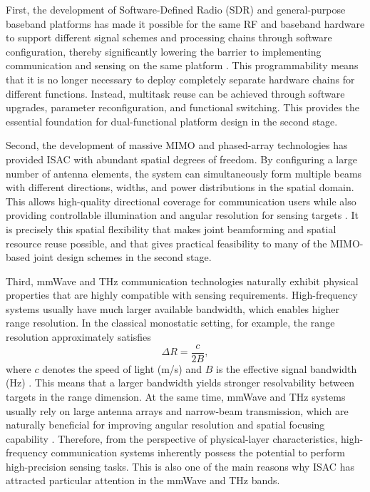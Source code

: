 First, the development of Software-Defined Radio (SDR) and general-purpose baseband platforms has made it possible for the same RF and baseband hardware to support different signal schemes and processing chains through software configuration, thereby significantly lowering the barrier to implementing communication and sensing on the same platform \cite{Mitola1995SDR}. This programmability means that it is no longer necessary to deploy completely separate hardware chains for different functions. Instead, multitask reuse can be achieved through software upgrades, parameter reconfiguration, and functional switching. This provides the essential foundation for dual-functional platform design in the second stage.

Second, the development of massive MIMO and phased-array technologies has provided ISAC with abundant spatial degrees of freedom. By configuring a large number of antenna elements, the system can simultaneously form multiple beams with different directions, widths, and power distributions in the spatial domain. This allows high-quality directional coverage for communication users while also providing controllable illumination and angular resolution for sensing targets \cite{Liu2020JointRadarComm,Li2023integrated}. It is precisely this spatial flexibility that makes joint beamforming and spatial resource reuse possible, and that gives practical feasibility to many of the MIMO-based joint design schemes in the second stage.

Third, mmWave and THz communication technologies naturally exhibit physical properties that are highly compatible with sensing requirements. High-frequency systems usually have much larger available bandwidth, which enables higher range resolution. In the classical monostatic setting, for example, the range resolution approximately satisfies
\[
\Delta R = \frac{c}{2B},
\]
where $c$ denotes the speed of light (m/s) and $B$ is the effective signal bandwidth (Hz) \cite{SkolnikRadarBook}. This means that a larger bandwidth yields stronger resolvability between targets in the range dimension. At the same time, mmWave and THz systems usually rely on large antenna arrays and narrow-beam transmission, which are naturally beneficial for improving angular resolution and spatial focusing capability \cite{Rappaport2019WirelessTHz}. Therefore, from the perspective of physical-layer characteristics, high-frequency communication systems inherently possess the potential to perform high-precision sensing tasks. This is also one of the main reasons why ISAC has attracted particular attention in the mmWave and THz bands.

